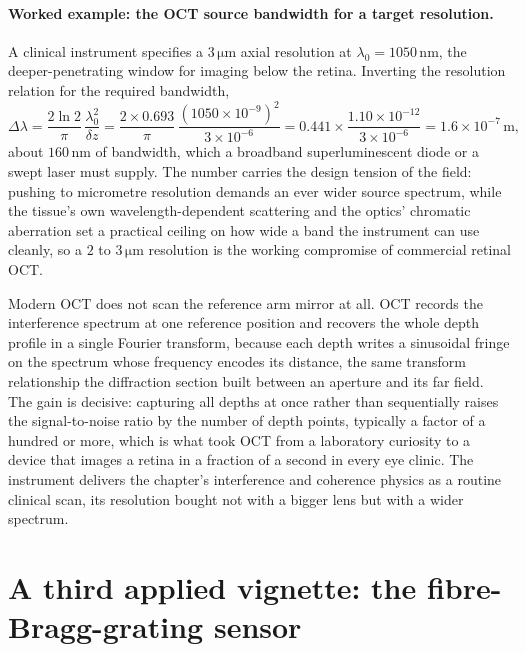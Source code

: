 \paragraph{Worked example: the OCT source bandwidth for a target resolution.} A
clinical instrument specifies a $3\,\si{\micro\meter}$ axial resolution at
$\lambda_0 = 1050\,\si{\nano\meter}$, the deeper-penetrating window for imaging
below the retina. Inverting the resolution relation for the required bandwidth,
\[
\Delta\lambda = \frac{2\ln 2}{\pi}\,\frac{\lambda_0^{2}}{\delta z}
= \frac{2\times 0.693}{\pi}\,\frac{(1050\times 10^{-9})^{2}}{3\times 10^{-6}}
= 0.441\times\frac{1.10\times 10^{-12}}{3\times 10^{-6}}
= 1.6\times 10^{-7}\,\si{\meter},
\]
about $160\,\si{\nano\meter}$ of bandwidth, which a broadband superluminescent
diode or a swept laser must supply. The number carries the design tension of the
field: pushing to micrometre resolution demands an ever wider source spectrum,
while the tissue's own wavelength-dependent scattering and the optics' chromatic
aberration set a practical ceiling on how wide a band the instrument can use
cleanly, so a $2$ to $3\,\si{\micro\meter}$ resolution is the working compromise
of commercial retinal OCT.

Modern OCT does not scan the reference arm mirror at all. 
OCT records the interference spectrum at one reference position and recovers the
whole depth profile in a single Fourier transform, because each depth writes a
sinusoidal fringe on the spectrum whose frequency encodes its distance, the same
transform relationship the diffraction section built between an aperture and its
far field. The gain is decisive: capturing all depths at once rather than
sequentially raises the signal-to-noise ratio by the number of depth points,
typically a factor of a hundred or more, which is what took OCT from a laboratory
curiosity to a device that images a retina in a fraction of a second in every eye
clinic. The instrument delivers the chapter's interference and coherence physics
as a routine clinical scan, its resolution bought not with a bigger lens but with
a wider spectrum.

\section{A third applied vignette: the fibre-Bragg-grating sensor}

